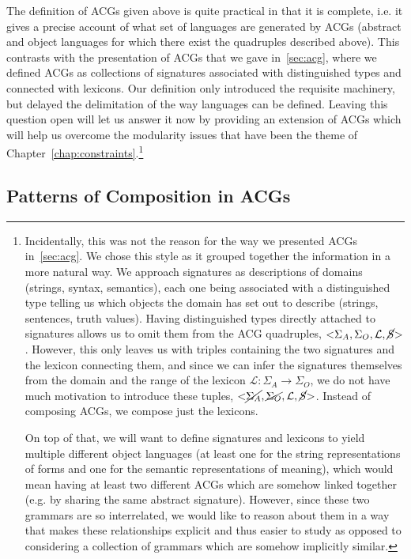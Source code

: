 The definition of ACGs given above is quite practical in that it is
complete, i.e. it gives a precise account of what set of languages are
generated by ACGs (abstract and object languages for which there exist
the quadruples described above). This contrasts with the presentation of
ACGs that we gave in~\ref{sec:acg}, where we defined ACGs as collections
of signatures associated with distinguished types and connected with
lexicons. Our definition only introduced the requisite machinery, but
delayed the delimitation of the way languages can be defined. Leaving
this question open will let us answer it now by providing an extension
of ACGs which will help us overcome the modularity issues that have been
the theme of Chapter~\ref{chap:constraints}.\footnote{Incidentally, this
  was not the reason for the way we presented ACGs in~\ref{sec:acg}. We
  chose this style as it grouped together the information in a more
  natural way. We approach signatures as descriptions of domains
  (strings, syntax, semantics), each one being associated with a
  distinguished type telling us which objects the domain has set out to
  describe (strings, sentences, truth values). Having distinguished
  types directly attached to signatures allows us to omit them from the
  ACG quadruples, $\mathopen{<}\Sigma_A, \Sigma_O, \mathcal{L},
  \cancel{S}\mathclose{>}$. However, this only leaves us with triples
  containing the two signatures and the lexicon connecting them, and
  since we can infer the signatures themselves from the domain and the
  range of the lexicon $\mathcal{L} : \Sigma_A \to \Sigma_O$, we do not
  have much motivation to introduce these tuples,
  $\mathopen{<}\cancel{\Sigma_A}, \cancel{\Sigma_O}, \mathcal{L},
  \cancel{S}\mathclose{>}$. Instead of composing ACGs, we compose just
  the lexicons.

On top of that, we will want to define signatures and lexicons to yield
multiple different object languages (at least one for the string
representations of forms and one for the semantic representations of
meaning), which would mean having at least two different ACGs which are
somehow linked together (e.g. by sharing the same abstract
signature). However, since these two grammars are so interrelated, we
would like to reason about them in a way that makes these relationships
explicit and thus easier to study as opposed to considering a collection
of grammars which are somehow implicitly similar.}

\subsection{Patterns of Composition in ACGs}
\label{ssec:acg-patterns}

